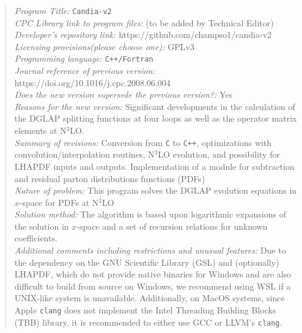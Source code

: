 \documentclass[preprint,12pt]{elsarticle}
\begin{document}
\begin{frontmatter}
\begin{abstract}
\begin{small}
\noindent
{\em Program Title:} \texttt{Candia-v2}                       \\
{\em CPC Library link to program files:} (to be added by Technical Editor) \\
{\em Developer's repository link:} https://github.com/champso1/candia-v2 \\
{\em Licensing provisions(please choose one):} GPLv3  \\
{\em Programming language:} \texttt{C++/Fortran}                        \\
{\em Journal reference of previous version:} https://doi.org/10.1016/j.cpc.2008.06.004    \\
{\em Does the new version supersede the previous version?:} Yes \\
{\em Reasons for the new version:} Significant developments in the calculation of the DGLAP splitting functions at four loops as well as the operator matrix elements at N$^3$LO.\\
{\em Summary of revisions:} Conversion from \texttt{C} to \texttt{C++}, optimizations with convolution/interpolation routines, N$^3$LO evolution, and possibility for LHAPDF inputs and outputs. Implementation of a module for subtraction and residual parton distributions functions (PDFs) \\
{\em Nature of problem:} This program solves the DGLAP evolution equations in $x$-space for PDFs at N$^3$LO \\
{\em Solution method:} The algorithm is based upon logarithmic expansions of the solution in $x$-space and a set of recursion relations for unknown coefficients. \\
{\em Additional comments including restrictions and unusual features:} Due to the dependency on the GNU Scientific Library (GSL) and (optionally) LHAPDF, which do not provide native binaries for Windows and are also difficult to build from source on Windows, we recommend using WSL if a UNIX-like system is unavailable. Additionally, on MacOS systems, since Apple \texttt{clang} does not implement the Intel Threading Building Blocks (TBB) library, it is recommended to either use GCC or LLVM's \texttt{clang}.

\end{small}
\end{abstract}
\end{frontmatter}
\end{document}
